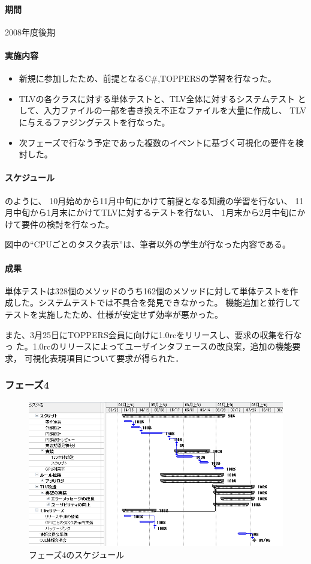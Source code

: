 \paragraph{期間} 2008年度後期

\paragraph{実施内容}
\begin{itemize}
\item 新規に参加したため、前提となるC\#,TOPPERSの学習を行なった。
\item TLVの各クラスに対する単体テストと、TLV全体に対するシステムテスト
  として、入力ファイルの一部を書き換え不正なファイルを大量に作成し、
  TLVに与えるファジングテスト\cite{fuzzing}を行なった。
\item 次フェーズで行なう予定であった複数のイベントに基づく可視化の要件を検討した。
\end{itemize}

\paragraph{スケジュール}
のように、
10月始めから11月中旬にかけて前提となる知識の学習を行ない、
11月中旬から1月末にかけてTLVに対するテストを行ない、
1月末から2月中旬にかけて要件の検討を行なった。

図中の``CPUごとのタスク表示''は、筆者以外の学生が行なった内容である。

\paragraph{成果}
単体テストは328個のメソッドのうち162個のメソッドに対して単体テストを作
成した。システムテストでは不具合を発見できなかった。
機能追加と並行してテストを実施したため、仕様が安定せず効率が悪かった。

また、3月25日にTOPPERS会員に向けに1.0rcをリリースし、要求の収集を行なっ
た。1.0rcのリリースによってユーザインタフェースの改良案，追加の機能要求，
可視化表現項目について要求が得られた．

\subsubsection{フェーズ4}
\begin{figure}
\centering
\includegraphics[width=\textwidth]{schedule4.png}
\caption{フェーズ4のスケジュール}\label{fig:sch4}
\end{figure}

